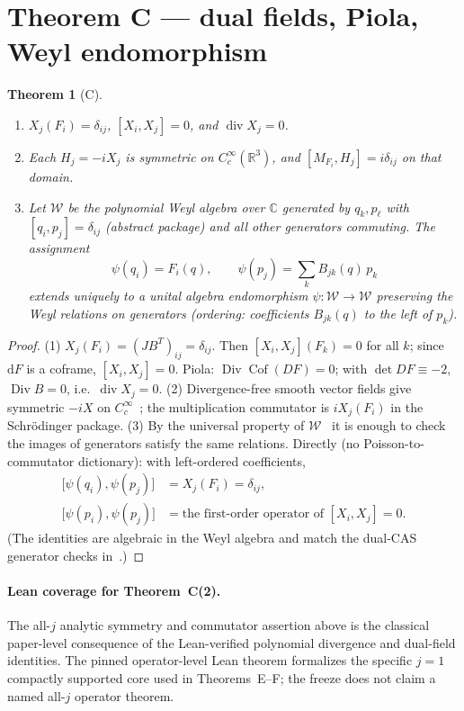 ﻿\documentclass[11pt]{article}
\newcommand{\filepath}[1]{\path{#1}}
\newtheorem{theorem}{Theorem}
\begin{document}
\section{Theorem C --- dual fields, Piola, Weyl endomorphism}
\begin{theorem}[C]
\begin{enumerate}
\item \(X_j(F_i)=\delta_{ij}\), \([X_i,X_j]=0\), and \(\operatorname{div} X_j=0\).
\item Each \(H_j=-iX_j\) is symmetric on \(C_c^\infty(\mathbb{R}^3)\), and \([M_{F_i},H_j]=i\delta_{ij}\) on that domain.
\item Let \(\mathcal{W}\) be the polynomial Weyl algebra over \(\mathbb{C}\) generated by \(q_k,p_\ell\) with \([q_i,p_j]=\delta_{ij}\) (abstract package) and all other generators commuting. The assignment
\[
\psi(q_i)=F_i(q),\qquad
\psi(p_j)=\sum_k B_{jk}(q)\,p_k
\]
extends uniquely to a unital algebra endomorphism \(\psi:\mathcal{W}\to\mathcal{W}\) preserving the Weyl relations on generators (ordering: coefficients \(B_{jk}(q)\) to the left of \(p_k\)).
\end{enumerate}
\end{theorem}
\begin{proof}
(1) \(X_j(F_i)=(JB^{T})_{ij}=\delta_{ij}\). Then \([X_i,X_j](F_k)=0\) for all \(k\); since \(\mathrm{d}F\) is a coframe, \([X_i,X_j]=0\). Piola: \(\operatorname{Div}\operatorname{Cof}(DF)=0\); with \(\det DF\equiv-2\), \(\operatorname{Div} B=0\), i.e.\ \(\operatorname{div} X_j=0\).
(2) Divergence-free smooth vector fields give symmetric \(-iX\) on \(C_c^\infty\)~\cite{RS2}; the multiplication commutator is \(iX_j(F_i)\) in the Schr\"odinger package.
(3) By the universal property of \(\mathcal{W}\)~\cite{DixmierWeyl} it is enough to check the images of generators satisfy the same relations. Directly (no Poisson-to-commutator dictionary): with left-ordered coefficients,
\begin{align*}
\bigl[\psi(q_i),\psi(p_j)\bigr]
&=X_j(F_i)=\delta_{ij},\\
\bigl[\psi(p_i),\psi(p_j)\bigr]
&=\text{the first-order operator of }[X_i,X_j]=0.
\end{align*}
(The identities are algebraic in the Weyl algebra and match the dual-CAS generator checks in~\cite{FredriksenSoft}.)
\end{proof}

\paragraph{Lean coverage for Theorem~C(2).}
The all-\(j\) analytic symmetry and commutator assertion above
is the classical paper-level consequence of the Lean-verified polynomial
divergence and dual-field identities. The pinned operator-level Lean theorem
\filepath{H_X1_min_isFormalAdjoint_H_X1_min} formalizes the specific
\(j=1\) compactly supported core used in Theorems~E--F; the freeze does not
claim a named all-\(j\) operator theorem.
\end{document}
